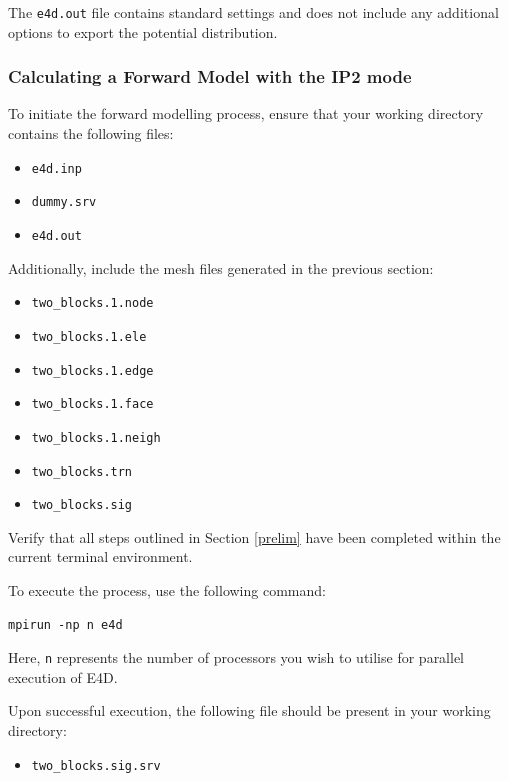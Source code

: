 \documentclass[a4paper,12pt]{article}
\begin{document}
The \texttt{e4d.out} file contains standard settings and does not include any
additional options to export the potential distribution.

\subsubsection{Calculating a Forward Model with the IP2 mode}

To initiate the forward modelling process, ensure that your working directory
contains the following files:

\begin{itemize}
    \item \texttt{e4d.inp}
    \item \texttt{dummy.srv}
    \item \texttt{e4d.out}
\end{itemize}

Additionally, include the mesh files generated in the previous section:

\begin{itemize}
    \item \texttt{two\_blocks.1.node}
    \item \texttt{two\_blocks.1.ele}
    \item \texttt{two\_blocks.1.edge}
    \item \texttt{two\_blocks.1.face}
    \item \texttt{two\_blocks.1.neigh}
    \item \texttt{two\_blocks.trn}
    \item \texttt{two\_blocks.sig}
\end{itemize}

Verify that all steps outlined in Section \ref{prelim} have been completed
within the current terminal environment.

To execute the process, use the following command:

\begin{verbatim}
mpirun -np n e4d
\end{verbatim}

Here, \texttt{n} represents the number of processors you wish to utilise for
parallel execution of E4D.

Upon successful execution, the following file should be present in your working
directory:

\begin{itemize}
    \item \texttt{two\_blocks.sig.srv}
\end{itemize}
\end{document}
